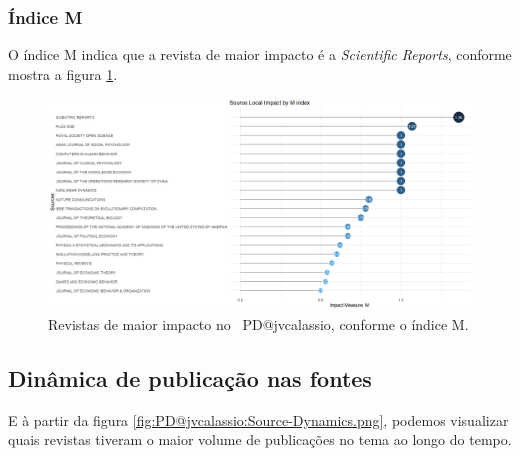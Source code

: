 \subsubsection{Índice M}

O índice M indica que a revista de maior impacto é a \textit{Scientific Reports}, conforme mostra a figura \ref{fig:PD@jvcalassio:M-Index-Source-Local-Impact.png}.

\begin{figure}
    \centering
    \includegraphics[width=1\textwidth]{exploratory-data-analysis/jvcalassio/PesqBibliogr/PrisonersDilemma/WoS-20221201/Dataset/SourceImpactM-2022-12-03.png}
    \caption{Revistas de maior impacto no  \dataset\ PD@jvcalassio,  conforme o índice M.}
    \label{fig:PD@jvcalassio:M-Index-Source-Local-Impact.png}
\end{figure}

\subsection{Dinâmica de publicação nas fontes}

E à partir da figura \ref{fig:PD@jvcalassio:Source-Dynamics.png}, podemos visualizar quais revistas tiveram o maior volume de publicações no tema ao longo do tempo.

